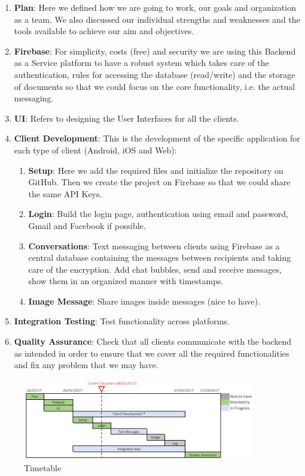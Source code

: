 \begin{enumerate}
	\item \textbf{Plan}: Here we defined how we are going to work, our goals and organization as a team. We also discussed our individual strengths and weaknesses and the tools available to achieve our aim and objectives.
	\item \textbf{Firebase}: For simplicity, costs (free) and security we are using this Backend as a Service platform to have a robust system which takes care of the authentication, rules for accessing the database (read/write) and the storage of documents so that we could focus on the core functionality, i.e. the actual messaging.
	\item \textbf{UI}: Refers to designing the User Interfaces for all the clients.
	\item \textbf{Client Development}: This is the development of the specific application for each type of client (Android, iOS and Web): 
	\begin{enumerate}
		\item \textbf{Setup}: Here we add the required files and initialize the repository on GitHub. Then we create the project on Firebase so that we could share the same API Keys.
		\item \textbf{Login}: Build the login page, authentication using email and password, Gmail and Facebook if possible.
		\item \textbf{Conversations}: Text messaging between clients using Firebase as a central database containing the messages between recipients and taking care of the encryption. Add chat bubbles, send and receive messages, show them in an organized manner with timestamps.  
		\item \textbf{Image Message}: Share images inside messages (nice to have).
	\end{enumerate}
		\item \textbf{Integration Testing}: Test functionality across platforms. 
		\item \textbf{Quality Assurance}: Check that all clients communicate with the backend as intended in order to ensure that we cover all the required functionalities and fix any problem that we may have.	
\end{enumerate}

\begin{figure}[ht]
\centering
\includegraphics[width=0.9\textwidth]{figs/Timetable}
	\caption{Timetable}
	\label{fig:timetable}
\end{figure}


